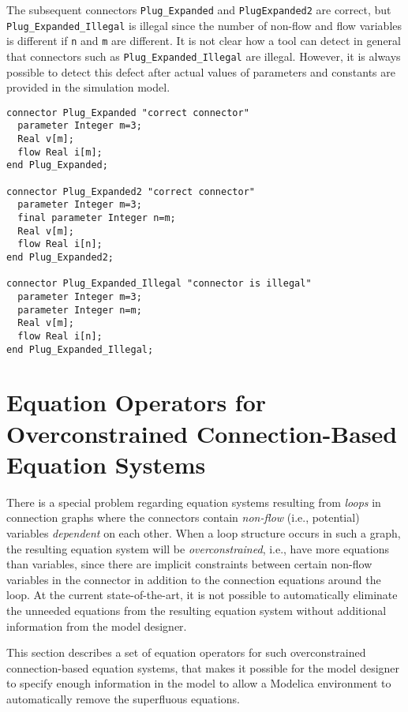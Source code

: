 \begin{example}
The subsequent connectors \lstinline!Plug_Expanded! and \lstinline!PlugExpanded2!
are correct, but \lstinline!Plug_Expanded_Illegal! is illegal since
the number of non-flow and flow variables is different if \lstinline!n! and \lstinline!m! are different. It is not clear how a tool can detect in
general that connectors such as \lstinline!Plug_Expanded_Illegal! are
illegal. However, it is always possible to detect this defect after
actual values of parameters and constants are provided in the simulation
model.

\begin{lstlisting}[language=modelica]
connector Plug_Expanded "correct connector"
  parameter Integer m=3;
  Real v[m];
  flow Real i[m];
end Plug_Expanded;

connector Plug_Expanded2 "correct connector"
  parameter Integer m=3;
  final parameter Integer n=m;
  Real v[m];
  flow Real i[n];
end Plug_Expanded2;

connector Plug_Expanded_Illegal "connector is illegal"
  parameter Integer m=3;
  parameter Integer n=m;
  Real v[m];
  flow Real i[n];
end Plug_Expanded_Illegal;
\end{lstlisting}
\end{example}

\section{Equation Operators for Overconstrained Connection-Based Equation Systems}

There is a special problem regarding equation systems resulting from
\emph{loops} in connection graphs where the connectors contain
\emph{non-flow} (i.e., potential) variables \emph{dependent} on each
other. When a loop structure occurs in such a graph, the resulting
equation system will be \emph{overconstrained}, i.e., have more
equations than variables, since there are implicit constraints between
certain non-flow variables in the connector in addition to the
connection equations around the loop. At the current state-of-the-art,
it is not possible to automatically eliminate the unneeded equations
from the resulting equation system without additional information from
the model designer.

This section describes a set of equation operators for such
overconstrained connection-based equation systems, that makes it
possible for the model designer to specify enough information in the
model to allow a Modelica environment to automatically remove the
superfluous equations.


